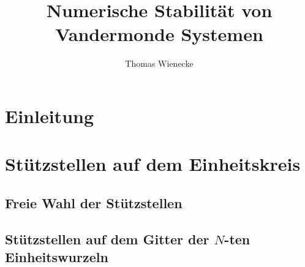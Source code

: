 \documentclass[a4paper, 11pt]{scrreprt}
\title{Numerische Stabilität von Vandermonde Systemen}
\author{Thomas Wienecke}
\begin{document}
\maketitle
\tableofcontents

\chapter{Einleitung}







\chapter{Stützstellen auf dem Einheitskreis}
\section{Freie Wahl der Stützstellen}
\section{Stützstellen auf dem Gitter der $N$-ten Einheitswurzeln}



\end{document}
